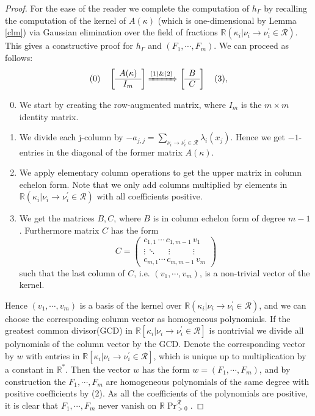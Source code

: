 \documentclass[10pt,a4paper]{amsart}
\theoremstyle{plain}
\theoremstyle{definition}
\theoremstyle{remark}
\def\Ga{\Gamma}
\def\R{\mathbb{R}}
\def\cR{\mathcal{R}}
\def\k{\kappa}
\def\la{\lambda}
\def\p{^{\prime}}
\begin{document}
\begin{proof}
For the ease of the reader we complete the computation of $h_\Ga$ by recalling the computation of the kernel of $A(\k)$ (which is one-dimensional by Lemma \ref{clm}) via Gaussian elimination over the field of fractions $\R(\k_i|{\nu_i\to\nu_i\p}\in\cR)$. This gives a constructive proof for $h_\Ga$ and $(F_1,\cdots,F_m)$. We can proceed as follows:
$$(0)\quad \left[
    	\begin{array}{cc|cc}
    	A(\k) \\
    	\hline
    	I_m \\	
    	\end{array}
    	\right]\xRightarrow{(1)\&(2)}
	\left[
    	\begin{array}{cc|cc}
    	B \\
    	\hline
    	C \\	
    	\end{array}
    	\right]\quad (3),	$$


\begin{enumerate}
\setcounter{enumi}{-1}
\item We start by creating the row-augmented matrix, where $I_m$ is the $m\times m$ identity matrix.
\item We divide each j-column by $-a_{j,j}=\sum_{\nu_i\to\nu_i\p\in\cR}\la_i(x_j)$. Hence we get $-1$-entries in the diagonal of the former matrix $A(\k)$. 
\item We apply elementary column operations to get the upper matrix in column echelon form. Note that we only add columns multiplied by elements in $\R(\k_i|{\nu_i\to\nu_i\p}\in\cR)$ with all coefficients positive.
\item We get the matrices $B,C$, where $B$ is in column echelon form of degree $m-1$. Furthermore  matrix $C$ has the form $$C=\begin{pmatrix}
c_{1,1}\,\cdots\, c_{1,m-1}\, v_1\\
\vdots\,\ddots\,\quad\,\vdots\,\,\,\,\,\,\,\,\,\,\,\,\,\,\,\,\vdots\\
c_{m,1}\cdots\, c_{m,m-1}\, v_m
\end{pmatrix}$$
	such that the last column of $C$, i.e. $(v_1,\cdots, v_m)$, is a non-trivial vector of the kernel.
\end{enumerate}
Hence $(v_1,\cdots, v_m)$ is a basis of the kernel over $\R(\k_i|{\nu_i\to\nu_i\p}\in\cR)$, and we can choose the corresponding column vector as homogeneous polynomials. If the greatest common divisor(GCD) in $\R[\k_i|{\nu_i\to\nu_i\p}\in\cR]$ is nontrivial we divide all polynomials of the column vector by the GCD. Denote the corresponding vector by $w$ with entries in $\R[\k_i|{\nu_i\to\nu_i\p}\in\cR]$, which is unique up to multiplication by a constant in $\R^*$.
 Then the vector $w$ has the form $w=(F_1,\cdots ,F_m)$, and by construction the $F_1,\cdots ,F_m$ are homogeneous polynomials of the same degree with positive coefficients by (2). As all the coefficients of the polynomials are positive, it is clear that $F_1,\cdots, F_m$ never vanish on $\R\Pr_{>0}^\cR$.
\end{proof}
\end{document}
